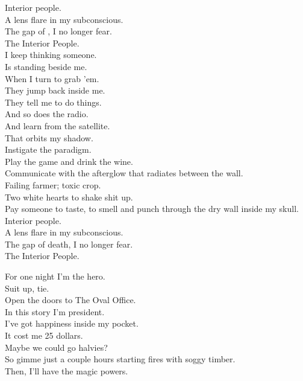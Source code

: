 Interior people. \\
A lens flare in my subconscious. \\
The gap of , I no longer fear. \\
The Interior People. \\

I keep thinking someone. \\
Is standing beside me. \\
When I turn to grab 'em. \\
They jump back inside me. \\
They tell me to do things. \\
And so does the radio. \\
And learn from the satellite. \\
That orbits my shadow. \\

Instigate the paradigm. \\
Play the game and drink the wine. \\
Communicate with the afterglow that radiates between the wall. \\

Failing farmer; toxic crop. \\
Two white hearts to shake shit up. \\
Pay someone to taste, to smell and punch through the dry wall inside my skull. \\

Interior people. \\
A lens flare in my subconscious. \\
The gap of death, I no longer fear. \\
The Interior People. \\




For one night I'm the hero. \\
Suit up, tie. \\
Open the doors to The Oval Office. \\
In this story I'm president. \\

I've got happiness inside my pocket. \\
It cost me 25 dollars. \\
Maybe we could go halvies? \\
So gimme just a couple hours starting fires with soggy timber. \\
Then, I'll have the magic powers. \\


